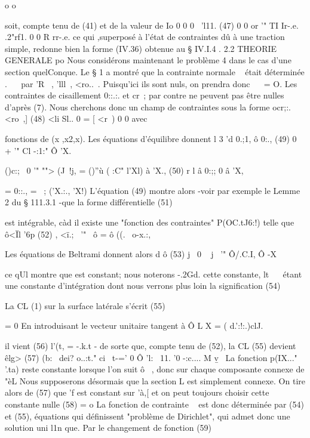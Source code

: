 {o 
o 

soit, compte tenu de (41) et de la valeur de Io 
0 0 0 
~'l11.
(47) 
0 0
or '" 
TI Ir-.e. 
.2"rf1. 
0 0 
R rr-.e. 
ce qui ,superposé à l'état de contraintes dû à une traction simple, redonne 
bien la forme (IV.36) obtenue au § IV.I.4 . 
2.2 THEORIE GENERALE 
po 
Nous considérons maintenant le problème 4 dans le cas d'une section 
quelConque. Le § 1 a montré que la contrainte normale ~ était déterminée
. 
~~ 
par 'R~ , 'lll~, <ro..~. Puisqu'ici ils sont nuls, on prendra donc ~~ = O. Les contraintes de cisaillement 0::.:. et cr~; par contre ne peuvent pas être nulles d'après (7). Nous cherchons donc un champ de contraintes sous la forme 
ocr;:. <ro~,]
(48) <li 
Sl.. 0
= [
<r~) 0 0 
avec 

fonctions de (x ,x2,x). Les équations d'équilibre donnent
l 3
'd 0.;1, ô 0:.,
(49) 0
+ '" 
Cl -:1:" Ô 'X.~ 

()c:;~ 0
'" ""> (J~!j, = ()''ù ( :C" l'Xl) 
à 'X.,
(50) r 
l â 0:;; 
0 
â 'X, 

= 0::., = ~; ('X.:., 'X!) 
L'équation (49) montre alors -voir par exemple le Lemme 2 du § 111.3.1 -que la forme différentielle 
(51) 

est intégrable, càd il existe une "fonction des contraintes" P(OC.tJ6:!) telle 
que 
ô<Ïl '6p
(52) ,
<ï.;~ '" ~ô = 
ô ((.~ o-x.:, 

Les équations de Beltrami donnent alors 
d ô
(53) j~ 0
~ 
j~ '" 
Ô/.C.I, Ô -X~ 

ce qUl montre que est constant; nous noterons -.2Gd. cette constante,
lt~ 
~ étant une constante d'intégration dont nous verrons plus loin la signifi­cation 
(54) 

La CL (1) sur la surface latérale s'écrit 
(55) 

= 0 
En introduisant le vecteur unitaire 
tangent à Ô L 
X = ( d.':!:.)clJ. 

il vient 
(56) 
l'(t, = -.k.t -­
de sorte que, compte tenu de (52), la CL (55) devient 
êlg>
(57) (b:~ dei? o..:t." ci~ 
t-=' 0 Ô 'l:~ 11. '0 -:c.... M v\b ~ 
La fonction p(IX..." '.ta) reste constante lorsque l'on suit ô~ , donc sur cha­que composante connexe de "èL Nous supposerons désormais que la section L 
est simplement connexe. On tire alors de (57) que 'f est constant sur 'à,[ et 
on peut toujours choisir cette constante nulle 
(58) = o 
La fonction de contrainte ~ est donc déterminée par (54) et (55), équations 
qui définissent "problème de Dirichlet", qui admet donc une solution uni­
l1n 
que. Par le changement de fonction 
(59) 

}
